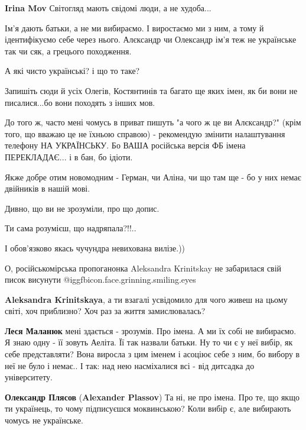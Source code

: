 \begin{itemize}
\begin{itemize}
\textbf{Irina Mov} Світогляд мають свідомі люди, а не худоба...
\end{itemize} %


Ім'я дають батьки, а не ми вибираємо. І виростаємо ми з ним, а тому й
ідентифікуємо себе через нього. Алєксандр чи Олександр ім'я теж не українське
так чи сяк, а грецього походження.

А які чисто українські? і що то таке?

Запишіть сюди й усіх Олегів, Костянтинів та багато ще яких імен, як би вони не
писалися...бо вони походять з інших мов.

До того ж, часто мені чомусь в приват пишуть "а чого ж це ви Алєксандр?" (крім
того, що вважаю це не їхньою справою) - рекомендую змінити налаштування
телефону НА УКРАЇНСЬКУ. Бо ВАША російська версія ФБ імена ПЕРЕКЛАДАЄ... і в
бан, бо ідіоти.

Якже добре отим новомодним - Герман, чи Аліна, чи що там ще - бо у них немає
двійників в нашій мові.

\begin{itemize} %
Дивно, що ви не зрозуміли, про що допис.

Ти сама розумієш, що надряпала?!!..

І обов'язково якась чучундра невихована вилізе.))

О, російськомірська пропоганонка Aleksandra Krinitskay не забарилася свій писок висунути @igg{fbicon.face.grinning.smiling.eyes} 

\textbf{Aleksandra Krinitskaya}, а ти взагалі усвідомило для чого живеш на цьому світі, хоч приблизно? Хоч раз за життя замислювалась?

\textbf{Леся Маланюк} мені здається - зрозумів. Про імена. А ми їх собі не вибираємо.
Я знаю одну - її зовуть Аеліта. Її так назвали батьки. Ну то чи є у неї вибір, як себе представляти? Вона виросла з цим іменем і асоціює себе з ним, бо вибору в неї не було і немає.. І так: над нею насміхалися всі - від дитсадка до університету.

\textbf{Олександр Плясов} (\textbf{Alexander Plassov}) Та ні, не про імена. Про те, що якщо ти українець, то чому підписуєшся моквинською?
Коли вибір є, але вибирають чомусь не українське.

\end{itemize} %


\end{itemize}

